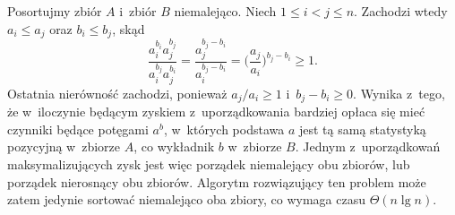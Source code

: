 \exercise %
\exercise %
Posortujmy zbiór $A$ i~zbiór $B$ niemalejąco.
Niech $1\le i<j\le n$.
Zachodzi wtedy $a_i\le a_j$ oraz $b_i\le b_j$, skąd
\[
	\frac{a_i^{b_i}a_j^{b_j}}{a_i^{b_j}a_j^{b_i}} = \frac{a_j^{b_j-b_i}}{a_i^{b_j-b_i}} = \biggl(\frac{a_j}{a_i}\biggr)^{b_j-b_i} \ge 1.
\]
Ostatnia nierówność zachodzi, ponieważ $a_j/a_i\ge1$ i~$b_j-b_i\ge0$.
Wynika z~tego, że w~iloczynie będącym zyskiem z~uporządkowania bardziej opłaca się mieć czynniki będące potęgami $a^b$, w~których podstawa $a$ jest tą samą statystyką pozycyjną w~zbiorze $A$, co wykładnik $b$ w~zbiorze $B$.
Jednym z~uporządkowań maksymalizujących zysk jest więc porządek niemalejący obu zbiorów, lub porządek nierosnący obu zbiorów.
Algorytm rozwiązujący ten problem może zatem jedynie sortować niemalejąco oba zbiory, co wymaga czasu $\Theta(n\lg n)$.
